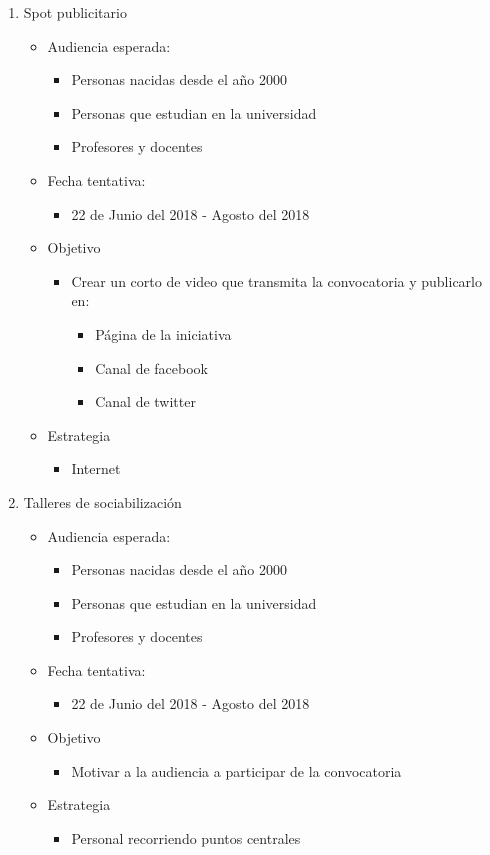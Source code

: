 \documentclass{article}
\begin{document}
\begin{enumerate}
\item Spot publicitario 
\begin{itemize}
\item Audiencia esperada:
\begin{itemize}
\item Personas nacidas desde el año 2000
\item Personas que estudian en la universidad
\item Profesores y docentes
\end{itemize}
\item Fecha tentativa:
\begin{itemize}
\item 22 de Junio del 2018 - Agosto del 2018
\end{itemize}
\item Objetivo
\begin{itemize}
\item Crear un corto de video que transmita la convocatoria y publicarlo en:
\begin{itemize}
\item Página de la iniciativa 
\item Canal de facebook
\item Canal de twitter
\end{itemize}
\end{itemize}
\item Estrategia
\begin{itemize}
\item Internet
\end{itemize}
\end{itemize}

\item Talleres de sociabilización 
\begin{itemize}
\item Audiencia esperada:
\begin{itemize}
\item Personas nacidas desde el año 2000
\item Personas que estudian en la universidad
\item Profesores y docentes
\end{itemize}
\item Fecha tentativa:
\begin{itemize}
\item 22 de Junio del 2018 - Agosto del 2018
\end{itemize}
\item Objetivo
\begin{itemize}
\item Motivar a la audiencia a participar de la convocatoria
\end{itemize}
\item Estrategia
\begin{itemize}
\item Personal recorriendo puntos centrales
\end{itemize}
\end{itemize}


\end{enumerate}
\end{document}

